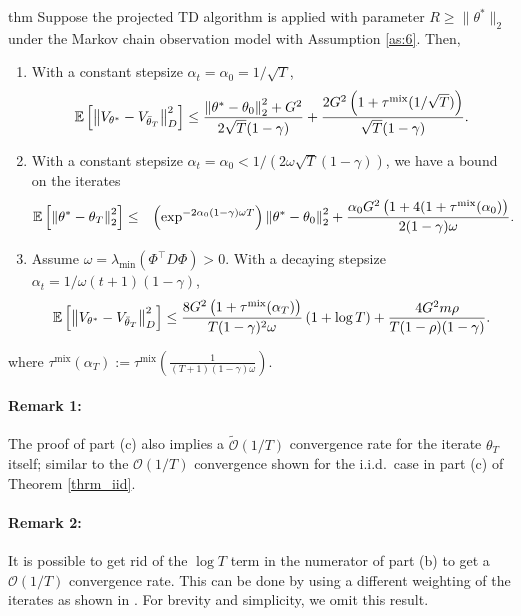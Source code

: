 \documentclass{colt2018} %
\DeclareMathOperator*{\mix}{mix}
\begin{document}
\begin{restatable}[]{thm}{}
\label{thrm:mc_ana}
Suppose the projected TD algorithm is applied with parameter $R \geq \| \theta^*\|_2$ under the Markov chain observation model with Assumption \ref{as:6}. Then,
\begin{enumerate}[label=(\alph*)]
\item With a constant stepsize $\alpha_t = \alpha_0 = 1/\sqrt{T}$,
\begin{eqnarray*}
\mathbb{E}\left[\norm{V_{\theta^*} - V_{\bar{\theta}_T}}^2_{D}\right] \leq \frac{\norm{\theta^* - \theta_0}_2^2 + G^2}{2\sqrt{T}(1-\gamma)} + \frac{2G^2 \left(1+\tau^{\mix}(1/\sqrt{T})\right)}{\sqrt{T} (1-\gamma)}.
\end{eqnarray*}

\item With a constant stepsize $\alpha_t = \alpha_0 < 1/(2 \omega \sqrt{T} (1-\gamma))$, we have a bound on the iterates
\begin{eqnarray*}
\mathbb{E} \left[\norm{\theta^*-\theta_{T}}_2^2\right] &\leq& \left(\exp^{-2\alpha_0(1-\gamma)\omega T}\right) \norm{\theta^*-\theta_0}_2^2 + \frac{\alpha_0 G^2 \left(1 + 4 (1+\tau^{\mix}(\alpha_0) \right)}{2(1-\gamma)\omega}.
\end{eqnarray*}

\item Assume $\omega = \lambda_{\min}(\Phi^\top D \Phi) > 0$. With a decaying stepsize $\alpha_t = 1/\omega (t+1) (1-\gamma)$,
\begin{eqnarray*}
\mathbb{E}\left[\norm{V_{\theta^*} - V_{\bar{\theta}_T}}^2_{D}\right] \leq \frac{8 G^2 \left(1 + \tau^{\mix}(\alpha_T)\right)}{T(1-\gamma)^2\omega} \left(1+\log T\right) + \frac{4G^2 m \rho}{T(1-\rho)(1-\gamma)}.
\end{eqnarray*}
\end{enumerate}
where $\tau^{\mix}(\alpha_T) := \tau^{\mix}\left(\frac{1}{(T+1)(1-\gamma)\omega}\right)$. 
\end{restatable}
\paragraph{Remark 1:} The proof of part (c) also implies a $\tilde{\mathcal{O}}(1/T)$ convergence rate for the iterate $\theta_{T}$ itself; similar to the $\mathcal{O}(1/T)$ convergence shown for the i.i.d.\ case in part (c) of Theorem \ref{thrm_iid}.

\paragraph{Remark 2:} It is possible to get rid of the $\log T$ term in the numerator of part (b) to get a $\mathcal{O}(1/T)$ convergence rate. This can be done by using a different weighting of the iterates as shown in \cite{lacoste2012simpler}. For brevity and simplicity, we omit this result.
  
\end{document}
